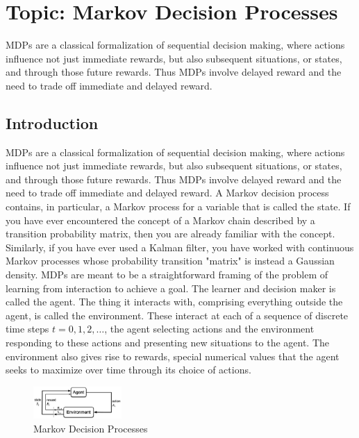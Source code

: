 \documentclass[11pt]{article}
\theoremstyle{plain} %
\theoremstyle{remark}
\begin{document}
\begin{center}

  {}
\end{center}
\vspace{2em}

\tableofcontents

\section{Topic: Markov Decision Processes}
MDPs are a classical formalization of sequential decision making, where actions
influence not just immediate rewards, but also subsequent situations, or states,
and through those future rewards. Thus MDPs involve delayed reward and the need
to trade off immediate and delayed reward.

\subsection{Introduction}
MDPs are a classical formalization of sequential decision making, where
actions influence not just immediate rewards, but also subsequent situations,
or states, and through those future rewards. Thus MDPs involve delayed reward and the need to trade off immediate and
delayed reward. A Markov decision process contains, in particular, a Markov process for
a variable that is called the state. If you have ever encountered the concept of a Markov chain described by
a transition probability matrix, then you are already familiar with the
concept. Similarly, if you have ever used a Kalman filter, you have worked with
continuous Markov processes whose probability transition "matrix" is instead a
Gaussian density. MDPs are meant to be a straightforward framing of the problem of
learning from interaction to achieve a goal. The learner and decision maker is called the agent. The thing it interacts with, comprising everything outside the agent, is
called the environment. These interact at each of a sequence of discrete time steps $t=0,1,2,
  \ldots$, the agent selecting actions and the environment responding to these
actions and presenting new situations to the agent. The environment also gives rise to rewards, special numerical values
that the agent seeks to maximize over time through its choice of actions.

\begin{figure}[!htp]
  \centering
  \includegraphics[width=0.3\textwidth]{images/2023_12_18_21a3a2e71c8a014fc272g-05}
  \caption{Markov Decision Processes}
  \label{fig:MDP}
\end{figure}
\end{document}
